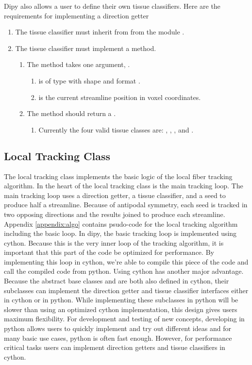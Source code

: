     Dipy also allows a user to define their own tissue classifiers. Here are the requirements for implementing a direction getter
\begin{enumerate}
\item The tissue classifier must inherit from  from the module .
\item The tissue classifier must implement a  method.
\begin{enumerate}
\item The  method takes one argument, .
\begin{enumerate}
\item {} is of type  with shape  and format .
\item {} is the current streamline position in voxel coordinates.
\end{enumerate}
\item The  method should return a .
\begin{enumerate}
\item Currently the four valid tissue classes are:  , , , and .
\end{enumerate}
\end{enumerate}
\end{enumerate}

\subsection{Local Tracking Class}
    The local tracking class implements the basic logic of the local fiber tracking algorithm. In the heart of the local tracking class is the main tracking loop. The main tracking loop uses a direction getter, a tissue classifier, and a seed to produce half a streamline. Because of antipodal symmetry, each seed is tracked in two opposing directions and the results joined to produce each streamline. Appendix \ref{appendix:algo} contains psudo-code for the local tracking algorithm including the basic loop. In dipy, the basic tracking loop is implemented using cython. Because this is the very inner loop of the tracking algorithm, it is important that this part of the code be optimized for performance. By implementing this loop in cython, we're able to compile this piece of the code and call the compiled code from python. Using cython has another major advantage. Because the abstract base classes  and  are both also defined in cython, their subclasses can implement the direction getter and tissue classifier interfaces either in cython or in python. While implementing these subclasses in python will be slower than using an optimized cython implementation, this design gives users maximum flexibility. For development and testing of new concepts, developing in python allows users to quickly implement and try out different ideas and for many basic use cases, python is often fast enough. However, for performance critical tasks users can implement direction getters and tissue classifiers in cython.
